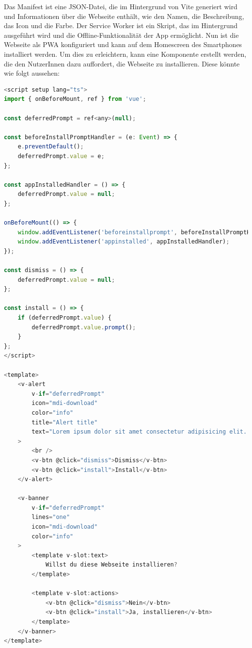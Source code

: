 Das Manifest ist eine \acf{JSON}-Datei, die im Hintergrund von Vite generiert wird und Informationen über die Webseite enthält, wie den Namen, die Beschreibung, das Icon und die Farbe. Der Service Worker ist ein Skript, das im Hintergrund ausgeführt wird und die Offline-Funktionalität der App ermöglicht. Nun ist die Webseite als \acs{PWA} konfiguriert und kann auf dem Homescreen des Smartphones installiert werden. Um dies zu erleichtern, kann eine Komponente erstellt werden, die den NutzerInnen dazu auffordert, die Webseite zu installieren. Diese könnte wie folgt aussehen:

\begin{lstlisting}[language={JavaScript}, caption={PWA Vue Komponente}]
<script setup lang="ts">
import { onBeforeMount, ref } from 'vue';

const deferredPrompt = ref<any>(null);

const beforeInstallPromptHandler = (e: Event) => {
    e.preventDefault();
    deferredPrompt.value = e;
};

const appInstalledHandler = () => {
    deferredPrompt.value = null;
};

onBeforeMount(() => {
    window.addEventListener('beforeinstallprompt', beforeInstallPromptHandler);
    window.addEventListener('appinstalled', appInstalledHandler);
});

const dismiss = () => {
    deferredPrompt.value = null;
};

const install = () => {
    if (deferredPrompt.value) {
        deferredPrompt.value.prompt();
    }
};
</script>

<template>
    <v-alert
        v-if="deferredPrompt"
        icon="mdi-download"
        color="info"
        title="Alert title"
        text="Lorem ipsum dolor sit amet consectetur adipisicing elit. Commodi, ratione debitis quis est labore voluptatibus! Eaque cupiditate minima, at placeat totam, magni doloremque veniam neque porro libero rerum unde voluptatem!"
    >
        <br />
        <v-btn @click="dismiss">Dismiss</v-btn>
        <v-btn @click="install">Install</v-btn>
    </v-alert>

    <v-banner
        v-if="deferredPrompt"
        lines="one"
        icon="mdi-download"
        color="info"
    >
        <template v-slot:text>
            Willst du diese Webseite installieren?
        </template>

        <template v-slot:actions>
            <v-btn @click="dismiss">Nein</v-btn>
            <v-btn @click="install">Ja, installieren</v-btn>
        </template>
    </v-banner>
</template>

\end{lstlisting}


